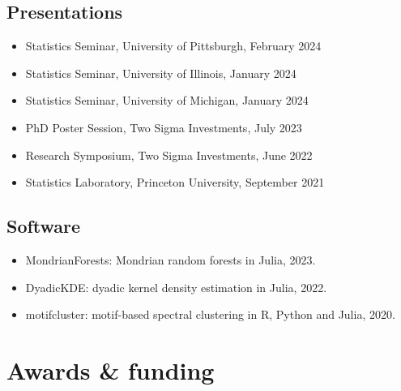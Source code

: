 \documentclass{wgu-cv}
\begin{document}
\subsection{Presentations}{}
\begin{itemize}

  \item Statistics Seminar, University of Pittsburgh, February 2024
  \item Statistics Seminar, University of Illinois, January 2024
  \item Statistics Seminar, University of Michigan, January 2024
  \item PhD Poster Session, Two Sigma Investments, July 2023
  \item Research Symposium, Two Sigma Investments, June 2022
  \item Statistics Laboratory, Princeton University, September 2021
\end{itemize}

\subsection{Software}{}
\begin{itemize}

  \item MondrianForests: Mondrian random forests in Julia, 2023. \\

  \item DyadicKDE: dyadic kernel density estimation in Julia, 2022. \\

  \item motifcluster: motif-based spectral clustering
    in R, Python and Julia, 2020. \\

\end{itemize}

\vspace{0.1cm}
\section{Awards \& funding}
\vspace{-0.22cm}
\end{document}
